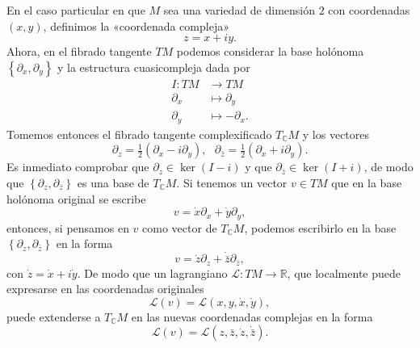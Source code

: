 \documentclass[11pt,a4paper,twoside]{article}
\theoremstyle{definition} \newtheorem{defn}[thm]{Definición}
\theoremstyle{definition} \newtheorem{ejemplo}[thm]{Ejemplo}
\theoremstyle{definition} \newtheorem{ejercicio}[thm]{Ejercicio}
\theoremstyle{remark} \newtheorem*{obs}{Observación}
\def\CC{\mathbb{C}}
\def\RR{\mathbb{R}}
\begin{document}
   En el caso particular en que $M$ sea una variedad de dimensión $2$ con coordenadas $(x,y)$, definimos la «coordenada compleja» 
   \begin{equation*}
     z=x+iy.
   \end{equation*}
   Ahora, en el fibrado tangente $TM$ podemos considerar la base holónoma $\left\{ \partial_x, \partial_y \right\}$ y la estructura cuasicompleja dada por
   \begin{align*}
     I :TM&\longrightarrow TM\\ 
       \partial_x &\longmapsto \partial_y \\
       \partial_y &\longmapsto -\partial_x .
     \end{align*}
     Tomemos entonces el fibrado tangente complexificado $T_{\CC}M$ y los vectores
     \begin{equation}
	 \partial_z=\tfrac{1}{2}(\partial_x-i\partial_y), \ \ \
	 \partial_{\bar{z}}=\tfrac{1}{2}(\partial_x+i\partial_y) .
     \end{equation}
     Es inmediato comprobar que 
	 $\partial_z\in \ker(I-i)$ y que
	 $\partial_{\bar{z}} \in \ker(I+i)$,
	 de modo que $\left\{ \partial_z, \partial_{\bar{z}} \right\}$ es una base de $T_{\CC}M$. Si tenemos un vector $v \in TM$ que en la base holónoma original se escribe
     \begin{equation}
       v = \dot{x} \partial_x + \dot{y} \partial_y,
     \end{equation}
     entonces, si pensamos en $v$ como vector de $T_{\CC}M$, podemos escribirlo en la base $\left\{ \partial_z, \partial_{\bar{z}} \right\}$ en la forma
     \begin{equation}
       v= \dot{z} \partial_z + \dot{\bar{z}} \partial_{\bar{z}},
     \end{equation}
     con $\dot{z}=\dot{x} + i \dot{y}$. De modo que un lagrangiano $\mathcal{L}:TM\rightarrow \RR$, que localmente puede expresarse en las coordenadas originales
     \begin{equation}
       \mathcal{L}(v)=\mathcal{L}(x,y,\dot{x},\dot{y}),
     \end{equation}
     puede extenderse a $T_{\CC}M$ en las nuevas coordenadas complejas en la forma
     \begin{equation}
       \mathcal{L} (v)=\mathcal{L}(z,\bar{z},\dot{z},\dot{\bar{z}}).
     \end{equation}
\end{document}
